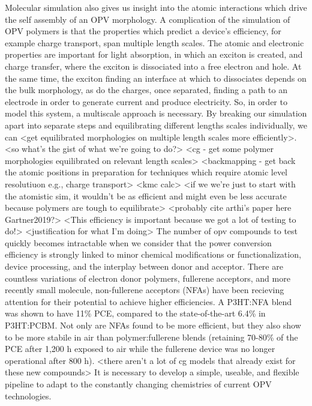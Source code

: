 Molecular simulation also gives us insight into the atomic interactions which drive the self assembly of an OPV morphology.
A complication of the simulation of OPV polymers is that the properties which predict a device's efficiency, for example charge transport, span multiple length scales.
The atomic and electronic properties are important for light absorption, in which an exciton is created, and charge transfer, where the exciton is dissociated into a free electron and hole\cite{Scharber2006,Hoppe2004,Mazzio2015}.
At the same time, the exciton finding an interface at which to dissociates depends on the bulk morphology, as do the charges, once separated, finding a path to an electrode in order to generate current and produce electricity.
So, in order to model this system, a multiscale approach is necessary.
By breaking our simulation apart into separate steps and equilibrating different lengths scales individually, we can <get equilibrated morphologies on multiple length scales more efficiently>.
<so what's the gist of what we're going to do?>
<cg - get some polymer morphologies equilibrated on relevant length scales>
<backmapping - get back the atomic positions in preparation for techniques which require atomic level resolutiuon e.g., charge transport>
<kmc calc>
<if we we're just to start with the atomistic sim, it wouldn't be as efficient and might even be less accurate because polymers are tough to equilibrate> <probably cite arthi's paper here Gartner2019?>
<This efficiency is important because we got a lot of testing to do!>
<justification for what I'm doing>
The number of opv compounds to test quickly becomes intractable when we consider that the power conversion efficiency is strongly linked to minor chemical modifications or functionalization, device processing, and the interplay between donor and acceptor\cite{Mazzio2015,Swick2019a}.
There are countless variations of electron donor polymers, fullerene acceptors, and more recently small molecule, non-fullerene acceptors (NFAs) have been recieving attention for their potential to achieve higher efficiencies\cite{Dou2013}.
A P3HT:NFA blend was shown to have 11\% PCE, compared to the state-of-the-art 6.4\% in P3HT:PCBM\cite{Baran2017}.
Not only are NFAs found to be more efficient, but they also show to be more stabile in air than polymer:fullerene blends (retaining 70-80\% of the PCE after 1,200 h exposed to air while the fullerene device was no longer operational after 800 h)\cite{Baran2017}.
<there aren't a lot of cg models that already exist for these new compounds>
It is necessary to develop a simple, useable, and flexible pipeline to adapt to the constantly changing chemistries of current OPV technologies.

